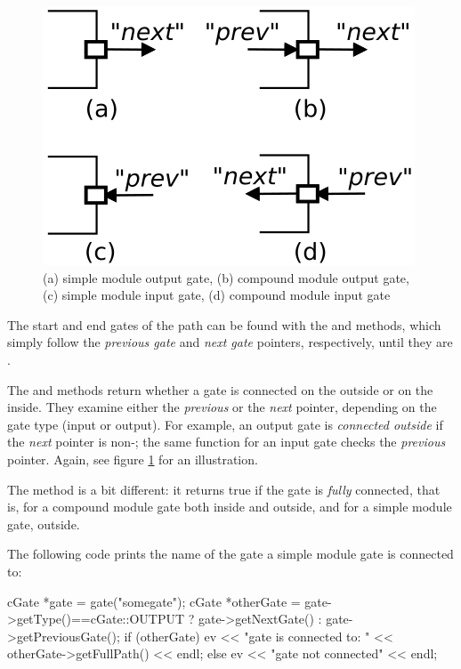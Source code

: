 \begin{figure}[htbp]
\begin{center}
\includegraphics{figures/simple-gates}
\caption{(a) simple module output gate, (b) compound module output gate,
         (c) simple module input gate, (d) compound module input gate}
\label{fig:ch-simple-modules:gates}
\end{center}
\end{figure}

The start and end gates of the path can be found with the 
and  methods, which simply follow the \textit{previous gate} and
\textit{next gate} pointers, respectively, until they are .

The  and  methods
return whether a gate is connected on the outside or on the inside. They
examine either the \textit{previous} or the \textit{next} pointer, depending on the
gate type (input or output). For example, an output gate is \textit{connected outside}
if the \textit{next} pointer is non-; the same function for an input gate
checks the \textit{previous} pointer. Again, see figure \ref{fig:ch-simple-modules:gates}
for an illustration.

The  method is a bit different: it returns true if the gate
is \textit{fully} connected, that is, for a compound module gate
both inside and outside, and for a simple module gate, outside.

The following code prints the name of the gate a simple module gate is
connected to:

\begin{cpp}
cGate *gate = gate("somegate");
cGate *otherGate = gate->getType()==cGate::OUTPUT ? gate->getNextGate() :
                                                    gate->getPreviousGate();
if (otherGate)
  ev << "gate is connected to: " << otherGate->getFullPath() << endl;
else
  ev << "gate not connected" << endl;
\end{cpp}


